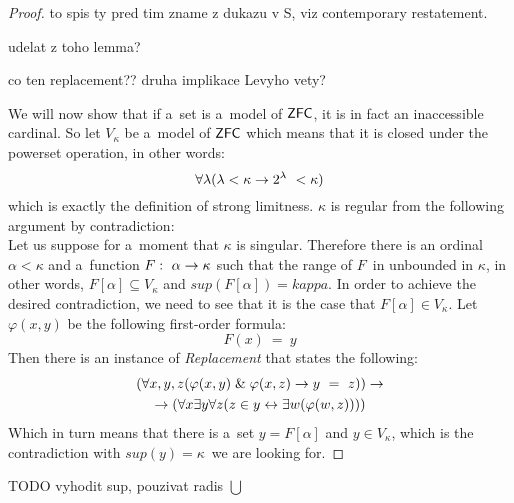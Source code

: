 \begin{proof}
to spis ty pred tim zname z dukazu v S, viz contemporary restatement.

udelat z toho lemma?

co ten replacement?? druha implikace Levyho vety?
\ece
\

We will now show that if a~set is a~model of $\sf{ZFC}$, it is in fact an inaccessible cardinal. So let $V_\kappa$ be a~model of $\sf{ZFC}$ which means that it is closed under the powerset operation, in other words:
\begin{equation}
\forall \lambda (\lambda < \kappa \then 2^{\lambda} < \kappa)
\end{equation}
which is exactly the definition of strong limitness. $\kappa$ is regular from the following argument by contradiction:\\
Let us suppose for a~moment that $\kappa$ is singular. Therefore there is an ordinal $\alpha < \kappa$ and a~function $F:\ \alpha \rightarrow \kappa$ such that the range of $F$ in unbounded in $\kappa$, in other words, $F[\alpha] \subseteq V_\kappa$ and $sup(F[\alpha]) = kappa$. In order to achieve the desired contradiction, we need to see that it is the case that $F[\alpha] \in V_\kappa$. Let $\varphi(x, y)$ be the following first-order formula: %
\begin{equation}
F(x)\ =\ y
\end{equation}
Then there is an instance of \emph{Replacement} that states the following:
\begin{equation}
\begin{gathered}
(\forall x, y, z(\varphi(x, y) \mathrel{\&} \varphi(x, z) \rightarrow y\ =\ z)) \rightarrow \\
\rightarrow (\forall x \exists y \forall z (z \in y \leftrightarrow \exists w (\varphi(w, z))))
\end{gathered}
\end{equation}
Which in turn means that there is a~set $y = F[\alpha]$ and $y \in V_\kappa$, which is the contradiction with $sup(y) = \kappa$ we are looking for.
\end{proof}
TODO vyhodit sup, pouzivat radis $\bigcup$



